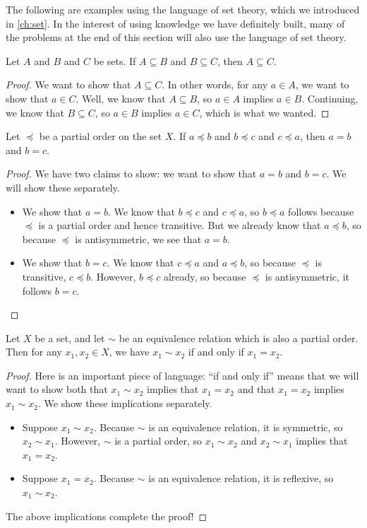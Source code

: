 \documentclass[../notes.tex]{subfiles}
\begin{document}
The following are examples using the language of set theory, which we introduced in \cref{ch:set}. In the interest of using knowledge we have definitely built, many of the problems at the end of this section will also use the language of set theory.
\begin{example}
    Let $A$ and $B$ and $C$ be sets. If $A\subseteq B$ and $B\subseteq C$, then $A\subseteq C$.
\end{example}
\begin{proof}
    We want to show that $A\subseteq C$. In other words, for any $a\in A$, we want to show that $a\in C$. Well, we know that $A\subseteq B$, so $a\in A$ implies $a\in B$. Continuing, we know that $B\subseteq C$, so $a\in B$ implies $a\in C$, which is what we wanted.
\end{proof}
\begin{example}
    Let $\preceq$ be a partial order on the set $X$. If $a\preceq b$ and $b\preceq c$ and $c\preceq a$, then $a=b$ and $b=c$.
\end{example}
\begin{proof}
    We have two claims to show: we want to show that $a=b$ and $b=c$. We will show these separately.
    \begin{itemize}
        \item We show that $a=b$. We know that $b\preceq c$ and $c\preceq a$, so $b\preceq a$ follows because $\preceq$ is a partial order and hence transitive. But we already know that $a\preceq b$, so because $\preceq$ is antisymmetric, we see that $a=b$.
        \item We show that $b=c$. We know that $c\preceq a$ and $a\preceq b$, so because $\preceq$ is transitive, $c\preceq b$. However, $b\preceq c$ already, so because $\preceq$ is antisymmetric, it follows $b=c$.
        \qedhere
    \end{itemize}
\end{proof}
\begin{example}
    Let $X$ be a set, and let $\sim$ be an equivalence relation which is also a partial order. Then for any $x_1,x_2\in X$, we have $x_1\sim x_2$ if and only if $x_1=x_2$.
\end{example}
\begin{proof}
    Here is an important piece of language: ``if and only if'' means that we will want to show both that $x_1\sim x_2$ implies that $x_1=x_2$ and that $x_1=x_2$ implies $x_1\sim x_2$. We show these implications separately.
    \begin{itemize}
        \item Suppose $x_1\sim x_2$. Because $\sim$ is an equivalence relation, it is symmetric, so $x_2\sim x_1$. However, $\sim$ is a partial order, so $x_1\sim x_2$ and $x_2\sim x_1$ implies that $x_1=x_2$.
        \item Suppose $x_1=x_2$. Because $\sim$ is an equivalence relation, it is reflexive, so $x_1\sim x_2$.
    \end{itemize}
    The above implications complete the proof!
\end{proof}
\end{document}
